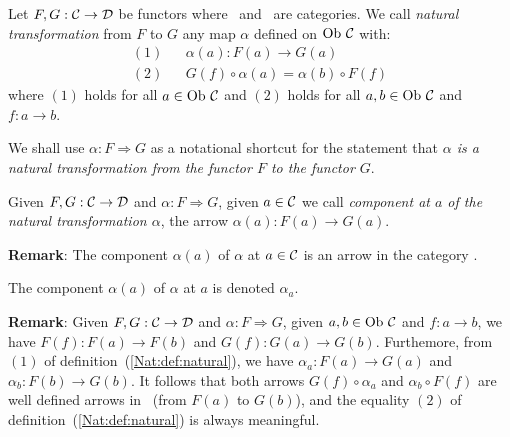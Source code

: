 \begin{defin}\label{Nat:def:natural}
    Let $F,G:\mbox{$\cal C$}\to\mbox{$\cal D$}$ be functors where \Cat\ and \Dat\ are categories.
    We call {\em natural transformation} from $F$ to $G$ any map $\alpha$
    defined on $\mbox{\rm Ob}\ \mbox{$\cal C$}$ with:
        \begin{eqnarray*}
            (1)& &\alpha(a) : F(a) \to G(a)\\
            (2)& &G(f)\circ\alpha(a) = \alpha(b) \circ F(f)
        \end{eqnarray*}
    where $(1)$ holds for all $a\in\mbox{\rm Ob}\ \mbox{$\cal C$}$ and $(2)$ holds for all 
    $a,b\in\mbox{\rm Ob}\ \mbox{$\cal C$}$ and $f:a\to b$.
\end{defin}
\begin{notation}\label{Nat:notation:natural:arrow}
    We shall use $\alpha:F\Rightarrow G$ as a notational shortcut for the
    statement that {\em $\alpha$ is a natural transformation from the
    functor $F$ to the functor $G$}.
\end{notation}

\begin{defin}\label{Nat:def:natural:component}
    Given $F,G:\mbox{$\cal C$}\to\mbox{$\cal D$}$ and $\alpha:F\Rightarrow G$, given $a\in\mbox{$\cal C$}$
    we call {\em component at $a$ of the natural transformation $\alpha$},
    the arrow $\alpha(a):F(a)\to G(a)$.
\end{defin}

\noindent
{\bf Remark}: The component $\alpha(a)$ of $\alpha$ at $a\in\mbox{$\cal C$}$ is an arrow 
in the category \Dat.

\begin{notation}\label{Nat:notation:natural:component}
    The component $\alpha(a)$ of $\alpha$ at $a$ is denoted $\alpha_{a}$.
\end{notation}

\noindent
{\bf Remark}: Given $F,G:\mbox{$\cal C$}\to\mbox{$\cal D$}$ and $\alpha:F\Rightarrow G$, given
$a,b\in\mbox{\rm Ob}\ \mbox{$\cal C$}$ and $f:a \to b$, we have $F(f):F(a) \to F(b)$ and 
$G(f):G(a)\to G(b)$. Furthemore, from $(1)$ of definition~(\ref{Nat:def:natural}), 
we have $\alpha_{a}:F(a)\to G(a)$ and $\alpha_{b}:F(b)\to G(b)$. It follows 
that both arrows $G(f)\circ\alpha_{a}$ and $\alpha_{b}\circ F(f)$ are well 
defined arrows in \Dat\ (from $F(a)$ to $G(b)$), and the equality $(2)$ of 
definition~(\ref{Nat:def:natural}) is always meaningful.
